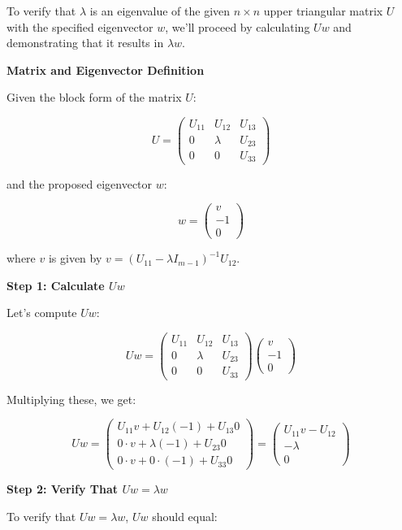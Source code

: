 \documentclass[8pt]{article}
\begin{document}
To verify that \(\lambda\) is an eigenvalue of the given \(n \times n\) upper triangular matrix \(U\) with the specified eigenvector \(w\), we'll proceed by calculating \(Uw\) and demonstrating that it results in \(\lambda w\).

\textbf{Matrix and Eigenvector Definition}

Given the block form of the matrix \(U\):

\[
U = \begin{pmatrix}
U_{11} & U_{12} & U_{13} \\
0 & \lambda & U_{23} \\
0 & 0 & U_{33}
\end{pmatrix}
\]

and the proposed eigenvector \(w\):

\[
w = \begin{pmatrix}
v \\
-1 \\
0
\end{pmatrix}
\]

where \(v\) is given by \(v = (U_{11} - \lambda I_{m-1})^{-1} U_{12}\).

\textbf{Step 1: Calculate \(Uw\)}

Let's compute \(Uw\):

\[
Uw = \begin{pmatrix}
U_{11} & U_{12} & U_{13} \\
0 & \lambda & U_{23} \\
0 & 0 & U_{33}
\end{pmatrix} \begin{pmatrix}
v \\
-1 \\
0
\end{pmatrix}
\]

Multiplying these, we get:

\[
Uw = \begin{pmatrix}
U_{11}v + U_{12}(-1) + U_{13}0 \\
0 \cdot v + \lambda(-1) + U_{23}0 \\
0 \cdot v + 0 \cdot (-1) + U_{33}0
\end{pmatrix} = \begin{pmatrix}
U_{11}v - U_{12} \\
-\lambda \\
0
\end{pmatrix}
\]

\textbf{Step 2: Verify That \(Uw = \lambda w\)}

To verify that \(Uw = \lambda w\), \(Uw\) should equal:
\end{document}
